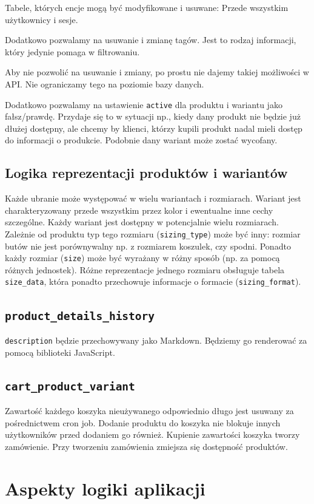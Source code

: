 Tabele, których encje mogą być modyfikowane i usuwane: Przede wszystkim użytkownicy i sesje.

Dodatkowo pozwalamy na usuwanie i zmianę tagów. Jest to rodzaj informacji, który jedynie pomaga w filtrowaniu.

Aby nie pozwolić na usuwanie i zmiany, po prostu nie dajemy takiej możliwości w API. Nie ograniczamy tego na poziomie bazy danych.

Dodatkowo pozwalamy na ustawienie \texttt{active} dla produktu i wariantu jako fałsz/prawdę. Przydaje się to w sytuacji np., kiedy dany produkt nie będzie już dłużej dostępny, ale chcemy by klienci, którzy kupili produkt nadal mieli dostęp do informacji o produkcie. Podobnie dany wariant może zostać wycofany.

\subsection*{Logika reprezentacji produktów i wariantów}
Każde ubranie może występować w wielu wariantach i rozmiarach. Wariant jest charakteryzowany przede wszystkim przez kolor i ewentualne inne cechy szczególne. Każdy wariant jest dostępny w potencjalnie wielu rozmiarach. Zależnie od produktu typ tego rozmiaru (\texttt{sizing\_type}) może być inny: rozmiar butów nie jest porównywalny np. z rozmiarem koszulek, czy spodni. Ponadto każdy rozmiar (\texttt{size}) może być wyrażany w różny sposób (np. za pomocą różnych jednostek). Różne reprezentacje jednego rozmiaru obsługuje tabela \texttt{size\_data}, która ponadto przechowuje informacje o formacie (\texttt{sizing\_format}).

\subsection*{\texttt{product\_details\_history}}
\texttt{description} będzie przechowywany jako Markdown. Będziemy go renderować za pomocą biblioteki JavaScript.

\subsection*{\texttt{cart\_product\_variant}}
Zawartość każdego koszyka nieużywanego odpowiednio długo jest usuwany za pośrednictwem cron job. Dodanie produktu do koszyka nie blokuje innych użytkowników przed dodaniem go również. Kupienie zawartości koszyka tworzy zamówienie. Przy tworzeniu zamówienia zmiejsza się dostępność produktów.

\section*{Aspekty logiki aplikacji}
